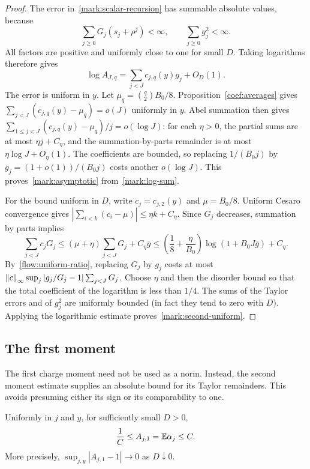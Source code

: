 \begin{proof}
The error in~\eqref{mark:scalar-recursion} has summable absolute values,
because
\[
 \sum_{j\ge0}G_j(s_j+\rho^j)<\infty,\qquad
 \sum_{j\ge0}g_j^2<\infty.
\]
All factors are positive and uniformly close to one for small $D$.
Taking logarithms therefore gives
\begin{equation}\label{mark:log-sum}
 \log A_{J,q}=\sum_{j<J}c_{j,q}(y)g_j+O_D(1).
\end{equation}
The error is uniform in $y$.
Let $\mu_q=\binom q2 B_0/8$.  Proposition~\ref{coef:averages} gives
$\sum_{j<J}(c_{j,q}(y)-\mu_q)=o(J)$ uniformly in $y$.
Abel summation then gives
$\sum_{1\le j<J}(c_{j,q}(y)-\mu_q)/j=o(\log J)$:
for each $\eta>0$, the partial sums are at most $\eta j+C_\eta$,
and the summation-by-parts remainder is at most
$\eta\log J+O_\eta(1)$.
The coefficients are bounded, so replacing $1/(B_0j)$ by
$g_j=(1+o(1))/(B_0j)$ costs another $o(\log J)$.
This proves~\eqref{mark:asymptotic} from~\eqref{mark:log-sum}.

For the bound uniform in $D$, write
$c_j=c_{j,2}(y)$ and $\mu=B_0/8$.
Uniform Cesaro convergence gives
$|\sum_{i<k}(c_i-\mu)|\le\eta k+C_\eta$.
Since $G_j$ decreases, summation by parts implies
\begin{equation}\label{mark:uniform-abel}
 \sum_{j<J}c_jG_j
 \le(\mu+\eta)\sum_{j<J}G_j+C_\eta\bar g
 \le\left(\frac18+\frac\eta{B_0}\right)
        \log(1+B_0J\bar g)+C_\eta.
\end{equation}
By~\eqref{flow:uniform-ratio}, replacing $G_j$ by $g_j$ costs at most
$\left\lVert c\right\rVert_{\infty}\sup_j|g_j/G_j-1|\sum_{j<J}G_j$.
Choose $\eta$ and then the disorder bound so that the total coefficient
of the logarithm is less than $1/4$.
The sums of the Taylor errors and of $g_j^2$ are uniformly bounded
(in fact they tend to zero with $D$).  Applying the logarithmic
estimate proves~\eqref{mark:second-uniform}.
\end{proof}

\subsection{The first moment}
The first charge moment need not be used as a norm.  Instead, the second
moment estimate supplies an absolute bound for its Taylor remainders.
This avoids presuming either its sign or its comparability to one.

\begin{proposition}\label{mark:first}
Uniformly in $j$ and $y$, for sufficiently small $D>0$,
\begin{equation}\label{mark:first-bound}
 \frac1C\le A_{j,1}=\mathbb E\alpha_j\le C.
\end{equation}
More precisely, $\sup_{j,y}|A_{j,1}-1|\to0$ as $D\downarrow0$.
\end{proposition}

